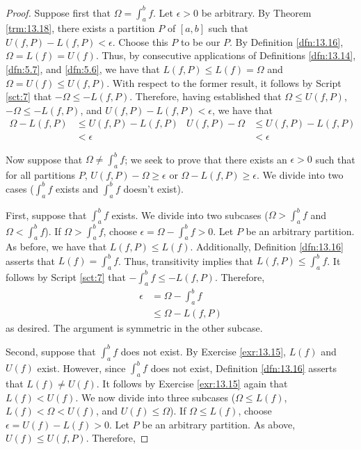 \documentclass[../main.tex]{subfiles}
\begin{document}
\begin{lemma}
\begin{proof}
        Suppose first that $\Omega=\int_a^bf$. Let $\epsilon>0$ be arbitrary. By Theorem \ref{trm:13.18}, there exists a partition $P$ of $[a,b]$ such that $U(f,P)-L(f,P)<\epsilon$. Choose this $P$ to be our $P$. By Definition \ref{dfn:13.16}, $\Omega=L(f)=U(f)$. Thus, by consecutive applications of Definitions \ref{dfn:13.14}, \ref{dfn:5.7}, and \ref{dfn:5.6}, we have that $L(f,P)\leq L(f)=\Omega$ and $\Omega=U(f)\leq U(f,P)$. With respect to the former result, it follows by Script \ref{sct:7} that $-\Omega\leq -L(f,P)$. Therefore, having established that $\Omega\leq U(f,P)$, $-\Omega\leq -L(f,P)$, and $U(f,P)-L(f,P)<\epsilon$, we have that
        \begin{align*}
            \Omega-L(f,P) &\leq U(f,P)-L(f,P)&
                U(f,P)-\Omega &\leq U(f,P)-L(f,P)\\
            &< \epsilon&
                &< \epsilon
        \end{align*}\par\smallskip
        Now suppose that $\Omega\neq\int_a^bf$; we seek to prove that there exists an $\epsilon>0$ such that for all partitions $P$, $U(f,P)-\Omega\geq\epsilon$ or $\Omega-L(f,P)\geq\epsilon$. We divide into two cases ($\int_a^bf$ exists and $\int_a^bf$ doesn't exist).\par
        First, suppose that $\int_a^bf$ exists. We divide into two subcases ($\Omega>\int_a^bf$ and $\Omega<\int_a^bf$). If $\Omega>\int_a^bf$, choose $\epsilon=\Omega-\int_a^bf>0$. Let $P$ be an arbitrary partition. As before, we have that $L(f,P)\leq L(f)$. Additionally, Definition \ref{dfn:13.16} asserts that $L(f)=\int_a^bf$. Thus, transitivity implies that $L(f,P)\leq\int_a^bf$. It follows by Script \ref{sct:7} that $-\int_a^bf\leq -L(f,P)$. Therefore,
        \begin{align*}
            \epsilon &= \Omega-\int_a^bf\\
            &\leq \Omega-L(f,P)
        \end{align*}
        as desired. The argument is symmetric in the other subcase.\par
        Second, suppose that $\int_a^bf$ does not exist. By Exercise \ref{exr:13.15}, $L(f)$ and $U(f)$ exist. However, since $\int_a^bf$ does not exist, Definition \ref{dfn:13.16} asserts that $L(f)\neq U(f)$. It follows by Exercise \ref{exr:13.15} again that $L(f)<U(f)$. We now divide into three subcases ($\Omega\leq L(f)$, $L(f)<\Omega<U(f)$, and $U(f)\leq\Omega$). If $\Omega\leq L(f)$, choose $\epsilon=U(f)-L(f)>0$. Let $P$ be an arbitrary partition. As above, $U(f)\leq U(f,P)$. Therefore,

\end{proof}
\end{lemma}
\end{document}
